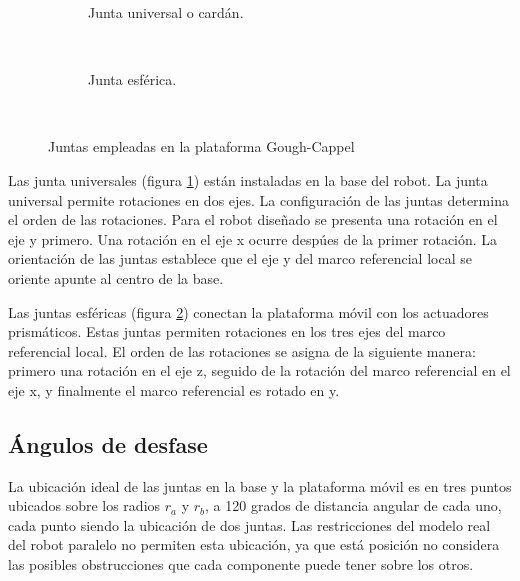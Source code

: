 \begin{figure}[htb!]
 \centering
    \begin{subfigure}[b]{0.4\textwidth}
        \caption{Junta universal o cardán.}
        \label{fig: junta universal}
    \end{subfigure}
    
    ~ %
    \begin{subfigure}[b]{0.4\textwidth}
        \caption{Junta esférica.}
        \label{fig: junta esferica}
    \end{subfigure}
    ~ %
    \caption{Juntas empleadas en la plataforma Gough-Cappel}\label{fig: joints}
\end{figure}

Las junta universales (figura \ref{fig: junta universal}) están
instaladas en la base del robot. 
La junta universal permite rotaciones en dos ejes.
La configuración de las juntas determina el orden de las rotaciones.
Para el robot diseñado se presenta una rotación en el eje y primero.
Una rotación en el eje x ocurre despúes de la primer rotación.
La orientación de las juntas establece que el eje y 
del marco referencial local se oriente apunte al centro de la base.

Las juntas esféricas (figura \ref{fig: junta esferica}) conectan la 
plataforma móvil con los actuadores prismáticos.
Estas juntas permiten rotaciones en los tres ejes del marco referencial
local.
El orden de las rotaciones se asigna de la siguiente manera:
primero una rotación en el eje z, seguido de la rotación del 
marco referencial en el eje x, y finalmente el marco 
referencial es rotado en y.

\subsection{Ángulos de desfase}

La ubicación ideal de las juntas en la base y la plataforma móvil 
es en tres puntos ubicados sobre los radios $r_a$ y $r_b$, 
a 120 grados de distancia angular de cada uno, 
cada punto siendo la ubicación de dos juntas.
Las restricciones del modelo real del robot paralelo no permiten esta
ubicación, ya que está posición no considera las posibles obstrucciones
que cada componente puede tener sobre los otros.\\

